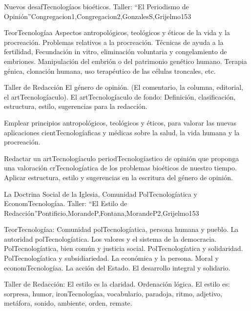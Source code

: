 \begin{syllabus}
\begin{unit}{Nuevos desafTecnologíaos bioéticos. Taller: ``El Periodismo de Opinión''}{Congregacion1,Congregacion2,GonzalesS,Grijelmo}{15}{3}
\begin{topics}
	\item TeorTecnologíaa
 		\subitem Aspectos antropológicos, teológicos y éticos de la vida y la procreación. 
 		\subitem Problemas relativos a la procreación. Técnicas de ayuda a la fertilidad, Fecundación in vitro, eliminación voluntaria y congelamiento de embriones.
 		\subitem Manipulación del embrión o del patrimonio genético humano. Terapia génica, clonación humana, uso terapéutico de las células troncales, etc.
	\item Taller de Redacción
 		\subitem El género de opinión. (El comentario, la columna, editorial, el artTecnologíaculo).
 		\subitem El artTecnologíaculo de fondo: Definición, clasificación, estructura, estilo, sugerencias para la redacción.
\end{topics}
\begin{unitgoals}
	\item Emplear principios antropológicos, teológicos y éticos, para valorar las nuevas aplicaciones cientTecnologíaficas y médicas sobre la salud, la vida humana y la procreación.
	\item Redactar un artTecnologíaculo periodTecnologíastico de opinión que proponga una valoración crTecnologíatica de los problemas bioéticos de nuestro tiempo. Aplicar estructura, estilo y sugerencias en la escritura del género de opinión.
\end{unitgoals}
\end{unit}

\begin{unit}{La Doctrina Social de la Iglesia, Comunidad PolTecnologíatica y EconomTecnologíaa. Taller: ``El Estilo de Redacción''}{Pontificio,MorandeP,Fontana,MorandeP2,Grijelmo}{15}{3}
\begin{topics}
	\item TeorTecnologíaa:
 		\subitem Comunidad polTecnologíatica, persona humana y pueblo. La autoridad polTecnologíatica. Los valores y el sistema de la democracia. PolTecnologíatica, bien común y justicia social. PolTecnologíatica y solidaridad. PolTecnologíatica y subsidiariedad.
 		\subitem La económica y la persona. Moral y economTecnologíaa. La acción del Estado. El desarrollo integral y solidario.
	\item Taller de Redacción:
 		\subitem El estilo es la claridad. Ordenación lógica. El estilo es: sorpresa, humor, ironTecnologíaa, vocabulario, paradoja, ritmo, adjetivo, metáfora, sonido, ambiente, orden, remate.


\end{topics}
\end{unit}
\end{syllabus}

